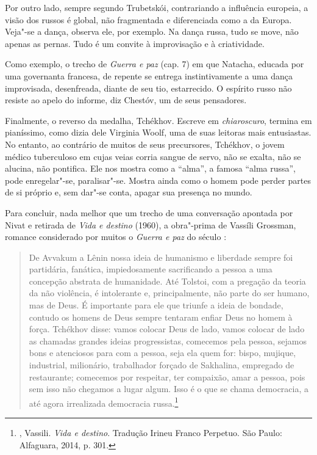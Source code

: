 Por outro lado, sempre segundo Trubetskói, contrariando a influência europeia, a visão dos russos é global, não fragmentada e diferenciada como a da Europa. Veja"-se a dança, observa ele, por exemplo. Na dança russa, tudo se move, não apenas as pernas. Tudo é um convite à improvisação e à criatividade.

Como exemplo, o trecho de \emph{Guerra e paz} (cap. 7) em que Natacha, educada por uma governanta francesa, de repente se entrega
instintivamente a uma dança improvisada, desenfreada, diante de seu tio, estarrecido. O espírito russo não resiste ao apelo do informe, diz Chestóv, um de seus pensadores.

Finalmente, o reverso da medalha, Tchékhov. Escreve em \emph{chiaroscuro}, termina em pianíssimo, como dizia dele Virginia
Woolf, uma de suas leitoras mais entusiastas. No entanto, ao contrário de muitos de seus precursores, Tchékhov, o jovem médico tuberculoso em cujas veias corria sangue de servo, não se exalta, não se alucina, não pontifica. Ele nos mostra como a ``alma'', a famosa ``alma russa'', pode enregelar"-se, paralisar"-se. Mostra ainda como o homem pode perder partes de si próprio e, sem dar"-se conta, apagar sua presença no mundo.

Para concluir, nada melhor que um trecho de uma conversação apontada por Nivat e retirada de \emph{Vida e destino} (1960), a obra"-prima de Vassíli Grossman, romance considerado por muitos o \emph{Guerra e paz} do século :

\begin{quotation}
De Avvakum a Lênin nossa ideia de humanismo e liberdade sempre foi partidária, fanática, impiedosamente sacrificando a pessoa a uma concepção abstrata de humanidade. Até Tolstoi, com a pregação da teoria da não violência, é intolerante e, principalmente, não parte do ser humano, mas de Deus. É importante para ele que triunfe a ideia de bondade, contudo os homens de Deus sempre tentaram enfiar Deus no homem à força. Tchékhov disse: vamos colocar Deus de lado, vamos colocar de
lado as chamadas grandes ideias progressistas, comecemos pela pessoa, sejamos bons e atenciosos para com a pessoa, seja ela quem for: bispo, mujique, industrial, milionário, trabalhador forçado de Sakhalina, empregado de restaurante; comecemos por respeitar, ter compaixão, amar a pessoa, pois sem isso não chegamos a lugar algum. Isso é o que se chama democracia, a até agora irrealizada democracia russa.\footnote{, Vassili. \emph{Vida e destino}. Tradução Irineu Franco Perpetuo. São Paulo: Alfaguara, 2014, p. 301.}
\end{quotation}


